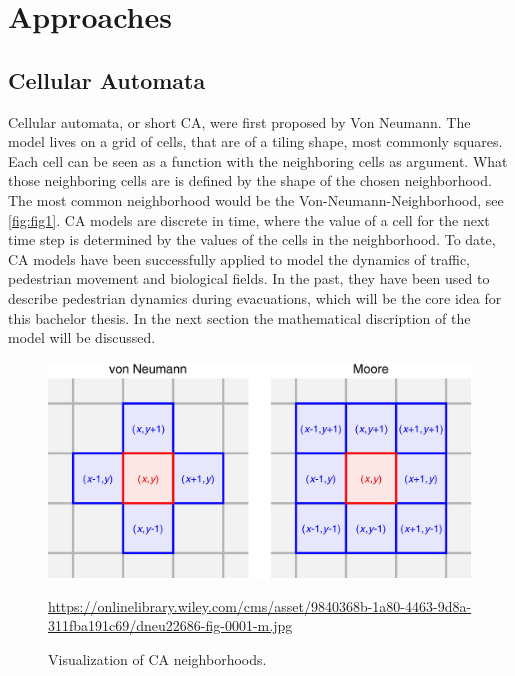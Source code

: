 \newpage
\section{Approaches}
\subsection{Cellular Automata}
Cellular automata, or short CA, were first proposed by Von Neumann. 
The model lives on a grid of cells, that are of a tiling shape, most commonly squares.
Each cell can be seen as a function with the neighboring cells as argument. 
What those neighboring cells are is defined by the shape of the chosen neighborhood. 
The most common neighborhood would be the Von-Neumann-Neighborhood, see \autoref*{fig:fig1}.
CA models are discrete in time, 
where the value of a cell for the next time step is determined by the values of the cells in the neighborhood. 
To date, CA models have been successfully applied to model the dynamics of traffic, pedestrian movement and biological fields. 
In the past, they have been used to describe pedestrian dynamics during evacuations, which will be the core idea for this bachelor thesis.
In the next section the mathematical discription of the model will be discussed. 

\begin{figure}[h]
   \centering 
   \includegraphics[width=0.8\linewidth]{content/figures/CA_Umgebungen.png} 
   \caption{Visualization of CA neighborhoods.}
   \url{https://onlinelibrary.wiley.com/cms/asset/9840368b-1a80-4463-9d8a-311fba191c69/dneu22686-fig-0001-m.jpg}
   \label{fig:fig1}
\end{figure}

